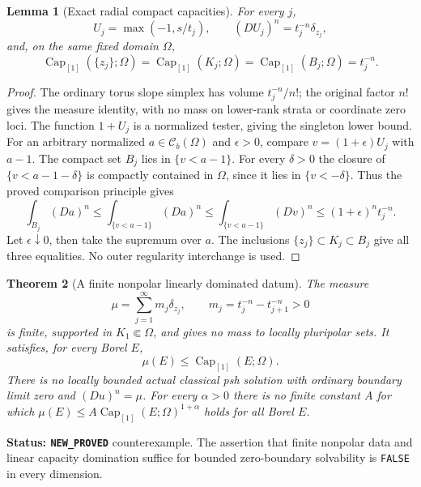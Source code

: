 \documentclass[11pt,a4paper]{article}
\numberwithin{equation}{section}
\newtheorem{theorem}{Theorem}[section]
\newtheorem{lemma}[theorem]{Lemma}
\theoremstyle{definition}
\theoremstyle{remark}
\begin{document}
\begin{lemma}[Exact radial compact capacities]
\label{lem:r3-radial-compact-capacity}
For every $j$,
\[
 U_j=\max(-1,s/t_j),\qquad
 (DU_j)^n=t_j^{-n}\delta_{z_j},
\]
and, on the same fixed domain $\Omega$,
\[
 \operatorname{Cap}_{[1]}(\{z_j\};\Omega)
 =\operatorname{Cap}_{[1]}(K_j;\Omega)
 =\operatorname{Cap}_{[1]}(B_j;\Omega)=t_j^{-n}.
\]
\end{lemma}

\begin{proof}
The ordinary torus slope simplex has volume $t_j^{-n}/n!$;
the original factor $n!$ gives the measure identity, with no
mass on lower-rank strata or coordinate zero loci. The function
$1+U_j$ is a normalized tester, giving the singleton lower bound.
For an arbitrary normalized $a\in\mathcal C_b(\Omega)$ and
$\epsilon>0$, compare $v=(1+\epsilon)U_j$ with $a-1$.
The compact set $B_j$ lies in $\{v<a-1\}$. For every
$\delta>0$ the closure of $\{v<a-1-\delta\}$ is compactly
contained in $\Omega$, since it lies in $\{v<-\delta\}$.
Thus the proved comparison principle gives
\[
 \int_{B_j}(Da)^n
 \leq\int_{\{v<a-1\}}(Da)^n
 \leq\int_{\{v<a-1\}}(Dv)^n
 \leq(1+\epsilon)^n t_j^{-n}.
\]
Let $\epsilon\downarrow0$, then take the supremum over $a$.
The inclusions $\{z_j\}\subset K_j\subset B_j$ give all three
equalities. No outer regularity interchange is used.
\end{proof}

\begin{theorem}[A finite nonpolar linearly dominated datum]
\label{thm:r3-linear-capacity-no-solution}
The measure
\begin{equation}
 \mu=\sum_{j=1}^\infty m_j\delta_{z_j},\qquad
 m_j=t_j^{-n}-t_{j+1}^{-n}>0
 \label{eq:r3-linear-capacity-datum}
\end{equation}
is finite, supported in $K_1\Subset\Omega$, and gives no mass
to locally pluripolar sets. It satisfies, for every Borel $E$,
\begin{equation}
 \mu(E)\leq\operatorname{Cap}_{[1]}(E;\Omega).
 \label{eq:r3-linear-capacity-bound}
\end{equation}
There is no locally bounded actual classical psh solution with
ordinary boundary limit zero and $(Du)^n=\mu$.
For every $\alpha>0$ there is no finite constant $A$ for which
$\mu(E)\leq A\operatorname{Cap}_{[1]}(E;\Omega)^{1+\alpha}$
holds for all Borel $E$.
\end{theorem}

\noindent\textbf{Status: \texttt{NEW\_PROVED}} counterexample.
The assertion that finite nonpolar data and linear capacity
domination suffice for bounded zero-boundary solvability is
\texttt{FALSE} in every dimension.
\end{document}
